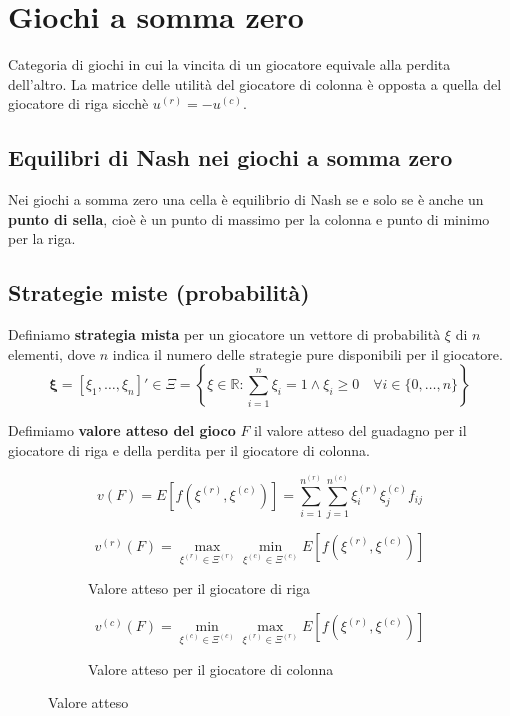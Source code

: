 \documentclass[\main/main.tex]{subfiles}
\begin{document}
\chapter{Giochi a somma zero}
Categoria di giochi in cui la vincita di un giocatore equivale alla perdita dell'altro. La matrice delle utilità del giocatore di colonna è opposta a quella del giocatore di riga sicchè $u^{(r)} = -u^{(c)}$.

\section{Equilibri di Nash nei giochi a somma zero}
Nei giochi a somma zero una cella è equilibrio di Nash se e solo se è anche un \textbf{punto di sella}, cioè è un punto di massimo per la colonna e punto di minimo per la riga.

\section{Strategie miste (probabilità)}
\begin{definition}
  Definiamo \textbf{strategia mista} per un giocatore un vettore di probabilità $\xi$ di $n$ elementi, dove $n$ indica il numero delle strategie pure disponibili per il giocatore.
  \[
    \bm{\xi} = [\xi_1, \ldots, \xi_n]' \in \Xi = \left\{ \xi \in \mathbb{R}: \sum_{i=1}^n \xi_i = 1 \land \xi_i \geq 0 \quad \forall i \in \{0,\ldots,n\} \right\}
  \]
\end{definition}

\begin{definition}
  Defimiamo \textbf{valore atteso del gioco} $F$ il valore atteso del guadagno per il giocatore di riga e della perdita per il giocatore di colonna.

  \[
    v(F) = E\left[ f(\xi^{(r)},\xi^{(c)}) \right] = \sum_{i=1}^{n^{(r)}}\sum_{j=1}^{n^{(c)}} \xi^{(r)}_i \xi^{(c)}_j f_{ij}
  \]

  \begin{figure}
    \begin{subfigure}{0.49\textwidth}
      \[
        v^{(r)}(F) = \max_{\xi^{(r)} \in \Xi^{(r)}} \min_{\xi^{(c)} \in \Xi^{(c)}} E\left[ f(\xi^{(r)},\xi^{(c)}) \right]
      \]
      \caption{Valore atteso per il giocatore di riga}
    \end{subfigure}
    \begin{subfigure}{0.49\textwidth}
      \[
        v^{(c)}(F) = \min_{\xi^{(c)} \in \Xi^{(c)}} \max_{\xi^{(r)} \in \Xi^{(r)}} E\left[ f(\xi^{(r)},\xi^{(c)}) \right]
      \]
      \caption{Valore atteso per il giocatore di colonna}
    \end{subfigure}
    \caption{Valore atteso}
  \end{figure}
\end{definition}
\end{document}
